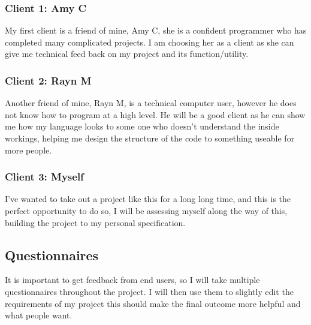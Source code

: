 \documentclass[a4paper,12pt]{article}
\begin{document}
{\subsubsection{Client 1: Amy C}
My first client is a friend of mine, Amy C, she is a confident programmer who has 
completed many complicated projects. I am choosing her as a client as she can give me
technical feed back on my project and its function/utility.
\subsubsection{Client 2: Rayn M}
Another friend of mine, Rayn M, is a technical computer user, however he does not know 
how to program at a high level. He will be a good client as he can show me how my
language looks to some one who doesn't understand the inside workings, helping me 
design the structure of the code to something useable for more people.
\subsubsection{Client 3: Myself}
I've wanted to take out a project like this for a long long time, and this is the 
perfect opportunity to do so, I will be assessing myself along the way of  this, 
building the project to my personal specification.

\subsection{Questionnaires}
It is important to get feedback from end users, so I will take multiple questionnaires 
throughout the project. I will then use them to slightly edit the requirements of my
project this should make the final outcome more helpful and what people want.
}
\end{document}

